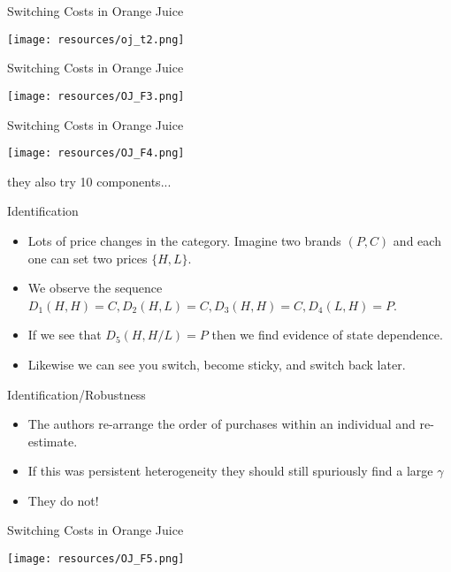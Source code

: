 \begin{frame}{Switching Costs in Orange Juice}
\begin{center}
\texttt{[image: resources/oj\_t2.png]}
\end{center}
\end{frame}

\begin{frame}{Switching Costs in Orange Juice}
\begin{center}
\texttt{[image: resources/OJ\_F3.png]}
\end{center}
\end{frame}

\begin{frame}{Switching Costs in Orange Juice}
\begin{center}
\texttt{[image: resources/OJ\_F4.png]}
\end{center}
they also try 10 components...
\end{frame}

\begin{frame}{Identification}
\begin{itemize}
\item Lots of price changes in the category. Imagine two brands $(P,C)$ and each one can set two prices $\{H,L\}$.
\item We observe the sequence $D_1(H,H) = C, D_2(H,L) = C, D_3(H,H) = C, D_4(L,H) = P$.
\item If we see that $D_5(H,H/L) = P$ then we find evidence of state dependence.
\item Likewise we can see you switch, become sticky, and switch back later.
\end{itemize}
\end{frame} 

\begin{frame}{Identification/Robustness}
\begin{itemize}
\item The authors re-arrange the order of purchases within an individual and re-estimate.
\item If this was persistent heterogeneity they should still spuriously find a large $\gamma$
\item They do not!
\end{itemize}
\end{frame}
 
\begin{frame}{Switching Costs in Orange Juice}
\begin{center}
\texttt{[image: resources/OJ\_F5.png]}
\end{center}
\end{frame}


